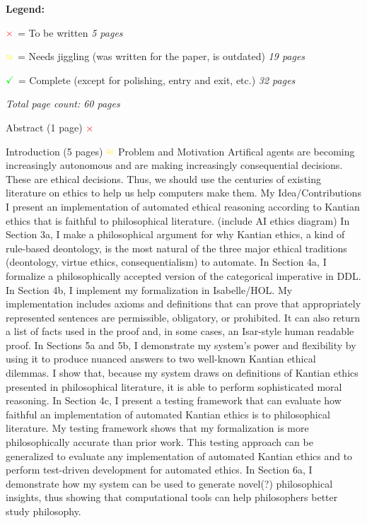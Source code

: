 \documentclass[11pt]{article}
\begin{document}
\textbf{Legend:}

$\color{red} \mathbf{\times} \color{black}$ = To be written \hfill \emph{5 pages}
 
$\color{yellow} \mathbf{\approx} \color{black}$ = Needs jiggling (was written for the paper, is outdated) \hfill \emph{19 pages}

$\color{green} \mathbf{\checkmark} \color{black}$ = Complete (except for polishing, entry and exit, etc.) \hfill \emph{32 pages}

\hfill \emph{Total page count: 60 pages}

\begin{outline}[enumerate]
\1 Abstract (1 page) \hfill $\color{red} \mathbf{\times} \color{black}$
 
\1 Introduction (5 pages) \hfill $\color{yellow} \mathbf{\approx} \color{black}$
\2 Problem and Motivation 
\3 Artifical agents are becoming increasingly autonomous and are making increasingly consequential 
decisions. These are ethical decisions. Thus, we should use the centuries of existing literature on
ethics to help us help computers make them.
\2 My Idea/Contributions 
\3 I present an implementation of automated ethical reasoning according to Kantian ethics that is 
faithful to philosophical literature. (include AI ethics diagram)
\3 In Section 3a, I make a philosophical argument for why Kantian ethics, a kind of rule-based 
deontology, is the most natural of the three major ethical traditions (deontology, virtue ethics, 
consequentialism) to automate.
\3 In Section 4a, I formalize a philosophically accepted version of 
the categorical imperative in DDL. 
\3 In Section 4b, I implement my formalization in Isabelle/HOL. My implementation 
includes axioms and definitions that can prove that appropriately represented sentences are permissible, 
obligatory, or prohibited. It can also return a list of facts used in the proof and, in some cases, 
an Isar-style human readable proof. 
\3 In Sections 5a and 5b, I demonstrate my system's power and flexibility by 
using it to produce nuanced answers to two well-known Kantian ethical dilemmas. I show that, because 
my system draws on definitions of Kantian ethics presented in philosophical literature, it is able to 
perform sophisticated moral reasoning. 
\3 In Section 4c, I present a testing framework that can evaluate how faithful an implementation 
of automated Kantian ethics is to philosophical literature. My testing framework shows that my formalization 
is more philosophically accurate than prior work. This testing approach can be generalized to evaluate any 
implementation of automated Kantian ethics and to perform test-driven development for automated ethics.
\3 In Section 6a, I demonstrate how my system can be used to generate novel(?) philosophical
insights, thus showing that computational tools can help philosophers better study philosophy.


\end{outline}
\end{document}
